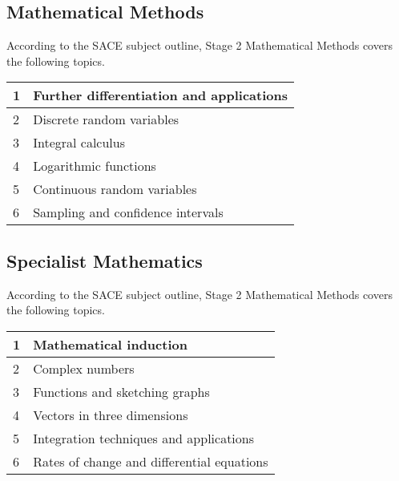 \documentclass[12pt]{report}
\begin{document}
\subsection{Mathematical Methods}

    According to the SACE subject outline, Stage 2 Mathematical Methods covers the following topics.
    \begin{table}[H]
        \centering
        \begin{tabular}{|l|l|}
        \hline
            1 & Further differentiation and applications \\ \hline
            2 & Discrete random variables \\ \hline
            3 & Integral calculus \\ \hline
            4 & Logarithmic functions \\ \hline
            5 & Continuous random variables \\ \hline
            6 & Sampling and confidence intervals \\ \hline
        \end{tabular}
    \end{table}

\subsection{Specialist Mathematics}

    According to the SACE subject outline, Stage 2 Mathematical Methods covers the following topics.
    \begin{table}[H]
        \centering
        \begin{tabular}{|l|l|}
        \hline
            1 & Mathematical induction \\ \hline
            2 & Complex numbers \\ \hline
            3 & Functions and sketching graphs \\ \hline
            4 & Vectors in three dimensions \\ \hline
            5 & Integration techniques and applications \\ \hline
            6 & Rates of change and differential equations \\ \hline
        \end{tabular}
    \end{table}

\end{document}
